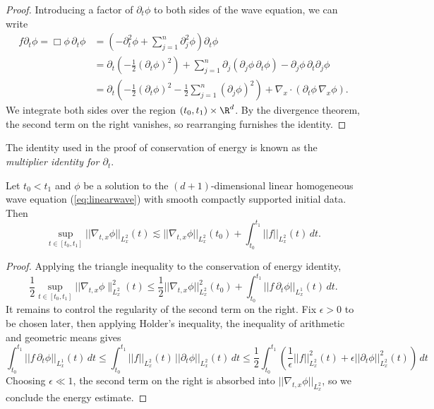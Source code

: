 \begin{proof}
	Introducing a factor of $\partial_t \phi$ to both sides of the wave equation, we can write
		\begin{align*}
		f \partial_t \phi 
			= \Box \phi \, \partial_t \phi  
			&= \left(- \partial_t^2 \phi + \sum_{j = 1}^n \partial_j^2 \phi\right) \partial_t \phi \\
			&= \partial_t \left( -\frac12 (\partial_t \phi)^2 \right) + \sum_{j = 1}^n \partial_j \left( \partial_j \phi \, \partial_t \phi \right) - \partial_j \phi \, \partial_t \partial_j \phi\\
			&= \partial_t \left( -\frac12 (\partial_t \phi)^2 - \frac12 \sum_{j = 1}^n (\partial_j \phi)^2 \right) + \nabla_x \cdot (\partial_t \phi \, \nabla_x \phi).
	\end{align*}
	We integrate both sides over the region $(t_0, t_1) \times \R^d$. By the divergence theorem, the second term on the right vanishes, so rearranging furnishes the identity. 
\end{proof}

\begin{remark}
	The identity used in the proof of conservation of energy is known as the \emph{multiplier identity for $\partial_t$}.
\end{remark}


\begin{corollary}
	Let $t_0 < t_1$ and $\phi$ be a solution to the $(d + 1)$-dimensional linear homogeneous wave equation (\ref{eq:linearwave}) with smooth compactly supported initial data. Then
		\[ \sup_{t \in [t_0, t_1]}||\nabla_{t, x} \phi||_{L^2_x} (t) \lesssim ||\nabla_{t, x} \phi||_{L^2_x} (t_0)+ \int_{t_0}^{t_1} ||f||_{L^2_x} (t) \, dt.  \]
\label{cor:energyest1}
\end{corollary}

\begin{proof}
	Applying the triangle inequality to the conservation of energy identity,
		\[\frac12 \sup_{t \in [t_0, t_1]} ||\nabla_{t, x} \phi\|_{L^2_x}^2 (t) \leq \frac12 ||\nabla_{t, x} \phi ||_{L^2_x}^2 (t_0) + \int_{t_0}^{t_1} ||f \, \partial_t \phi ||_{L^1_x} (t) \, dt. \]
	It remains to control the regularity of the second term on the right. Fix $\epsilon > 0$ to be chosen later, then applying Holder's inequality, the inequality of arithmetic and geometric means gives
		\[ \int_{t_0}^{t_1} ||f \, \partial_t \phi ||_{L^1_x} (t) \, dt \leq \int_{t_0}^{t_1} ||f||_{L_x^2} (t) \, ||\partial_t \phi||_{L_x^2} (t) \, dt \leq \frac12\int_{t_0}^{t_1} \left( \frac{1}{\epsilon} ||f||_{L^2_x}^2 (t) + \epsilon ||\partial_t \phi||_{L^2_x}^2 (t) \right) \, dt \]	
	Choosing $\epsilon \ll 1$, the second term on the right is absorbed into $||\nabla_{t, x} \phi||_{L^2_x}$, so we conclude the energy estimate.
\end{proof}

